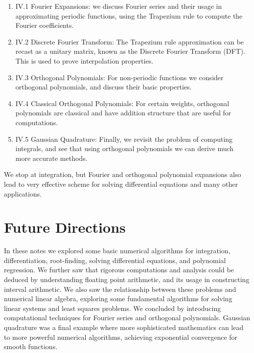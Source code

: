 \documentclass[12pt,a4paper]{book}
\theoremstyle{definition}
\begin{document}
\begin{enumerate}
    \item IV.1 Fourier Expansions: we discuss Fourier series and their usage in approximating periodic functions, using the Trapezium rule to compute the Fourier coefficients.
    \item IV.2 Discrete Fourier Transform: The Trapezium rule approximation can be recast as a unitary matrix, known as the Discrete Fourier Transform (DFT). This is used to prove interpolation properties.
    \item IV.3 Orthogonal Polynomials: For non-periodic functions we consider orthogonal polynomials, and discuss their basic properties.
    \item IV.4 Classical Orthogonal Polynomials: For certain weights, orthogonal polynomials are classical and have addition structure that are useful for computations.
    \item IV.5 Gaussian Quadrature: Finally, we revisit the  problem of computing integrals, and see that using orthogonal polynomials we can derive much more accurate methods.
    \end{enumerate}

We stop at integration, but Fourier and orthogonal polynomial expansions also lead to very effective scheme for solving differential equations
and many other applications.








\chapter{Future Directions}

In these notes we explored some basic numerical algorithms for integration, differentiation, root-finding, solving differential equations, and
polynomial regression.
We further saw that rigorous computations and analysis could be deduced by understanding floating point arithmetic, and its usage in
constructing interval arithmetic.
We also saw the relationship between these problems and numerical linear algebra, exploring some fundamental algorithms for solving linear
systems and least squares problems.  We concluded by introducing computational techniques for Fourier series and orthogonal polynomials. 
Gaussian quadrature was a final example where more sophisticated mathematics can lead to more powerful numerical algorithms,
achieving exponential convergence for smooth functions.
\end{document}

